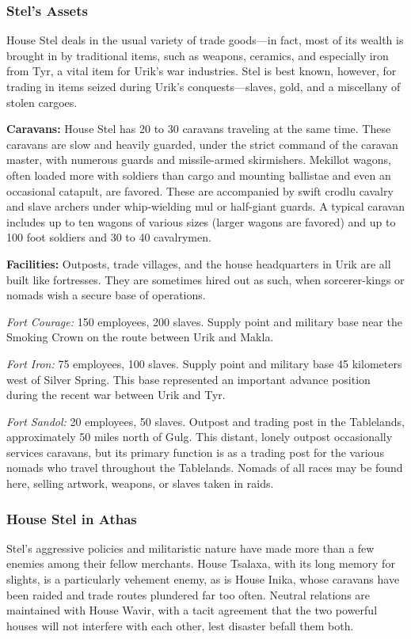 \subsubsection{Stel's Assets}
House Stel deals in the usual variety of trade goods---in fact, most of its wealth is brought in by traditional items, such as weapons, ceramics, and especially iron from Tyr, a vital item for Urik's war industries. Stel is best known, however, for trading in items seized during Urik's conquests---slaves, gold, and a miscellany of stolen cargoes.

\textbf{Caravans:} House Stel has 20 to 30 caravans traveling at the same time. These caravans are slow and heavily guarded, under the strict command of the caravan master, with numerous guards and missile-armed skirmishers. Mekillot wagons, often loaded more with soldiers than cargo and mounting ballistae and even an occasional catapult, are favored. These are accompanied by swift crodlu cavalry and slave archers under whip-wielding mul or half-giant guards. A typical caravan includes up to ten wagons of various sizes (larger wagons are favored) and up to 100 foot soldiers and 30 to 40 cavalrymen.

\textbf{Facilities:} Outposts, trade villages, and the house headquarters in Urik are all built like fortresses. They are sometimes hired out as such, when sorcerer-kings or nomads wish a secure base of operations.

\textit{Fort Courage:} 150 employees, 200 slaves. Supply point and military base near the Smoking Crown on the route between Urik and Makla.

\textit{Fort Iron:} 75 employees, 100 slaves. Supply point and military base 45 kilometers west of Silver Spring. This base represented an important advance position during the recent war between Urik and Tyr.

\textit{Fort Sandol:} 20 employees, 50 slaves. Outpost and trading post in the Tablelands, approximately 50 miles north of Gulg. This distant, lonely outpost occasionally services caravans, but its primary function is as a trading post for the various nomads who travel throughout the Tablelands. Nomads of all races may be found here, selling artwork, weapons, or slaves taken in raids.

\subsubsection{House Stel in Athas}
Stel's aggressive policies and militaristic nature have made more than a few enemies among their fellow merchants. House Tsalaxa, with its long memory for slights, is a particularly vehement enemy, as is House Inika, whose caravans have been raided and trade routes plundered far too often. Neutral relations are maintained with House Wavir, with a tacit agreement that the two powerful houses will not interfere with each other, lest disaster befall them both.

